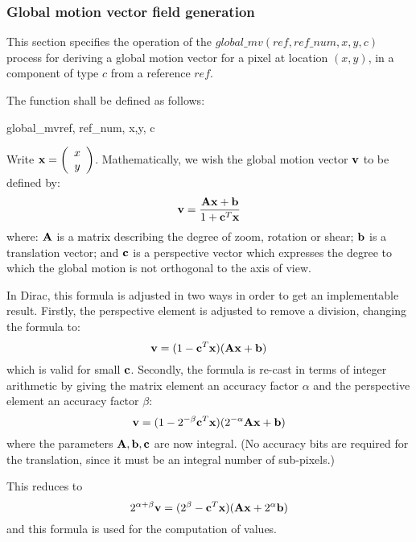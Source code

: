 \subsubsection{Global motion vector field generation}
\label{globalmv}

This section specifies the operation of the $global\_mv(ref, ref\_num, x,y, c)$ process
for deriving a global motion vector for a pixel at location $(x,y)$, in a component of 
type $c$ from a reference $ref$.

The function shall be defined as follows:

\begin{pseudo}{global\_mv}{ref, ref\_num, x,y, c}
\end{pseudo}

\begin{informative}
Write ${\bf x}=\left( \begin{array}{c} x\\y \end{array}\right)$. 
Mathematically, we wish the global motion vector ${\bf v}$ to be defined by:
\[{\bf v}=\dfrac{{\bf Ax}+{\bf b}}{1+{\bf c}^T{\bf x}}\]
where: ${\bf A}$ is a matrix describing the degree of zoom, rotation or shear; ${\bf b}$
is a translation vector; and ${\bf c}$ is a perspective vector which expresses the
degree to which the global motion is not orthogonal to the axis of view.

In Dirac, this formula is adjusted in two ways in order to get an implementable result.
Firstly, the perspective element is adjusted to remove a division, changing the 
formula to:
\[{\bf v}=(1-{\bf c}^T{\bf x})({\bf Ax}+{\bf b})\]
which is valid for small ${\bf c}$. Secondly, the formula is re-cast in terms of integer
arithmetic by giving the matrix element an accuracy factor $\alpha$ and the perspective
element an accuracy factor $\beta$:
\[{\bf v}=(1-2^{-\beta}{\bf c}^T{\bf x})(2^{-\alpha}{\bf Ax}+{\bf b})\]
where the parameters ${\bf A}, {\bf b},{\bf c}$ are now integral. (No accuracy bits are required for the translation, since it must be an integral number of sub-pixels.) 

This reduces to
\[2^{\alpha+\beta}{\bf v}=(2^\beta-{\bf c}^T{\bf x})({\bf Ax}+2^\alpha{\bf b})\]
and this formula is used for the computation of values.
\end{informative}

